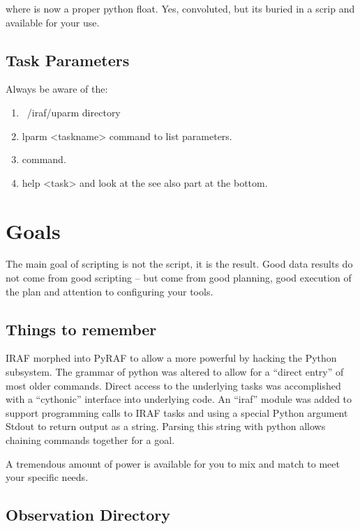 \documentclass[letter,11pt,oneside]{article}
\newcommand{\dhl}[1]{{\color{verbcolor}{\texttt#1}}}
\begin{document}
where \dhl{mymean} is now a proper python float. Yes, convoluted, but
its buried in a scrip and available for your use. 

\subsection{Task Parameters}

Always be aware of the:
\vspace{-.15cm}
\begin{enumerate}\addtolength{\itemsep}{-0.5\baselineskip}
   \item    ~/iraf/uparm directory
   \item    lparm <taskname> command to list parameters.
   \item    \dhl{unlearn <task>} command.
   \item   help <task> and look at the see also part at the bottom.
\end{enumerate}

\section{Goals}

The main goal of scripting is not the script, it is the result. Good
data results do not come from good scripting -- but come from good
planning, good execution of the plan and attention to configuring
your tools.


\subsection{Things to remember}

IRAF \dhl{cl} morphed into PyRAF \cite{2006hstc.conf..437G} to allow a more
powerful \dhl{cl} by hacking the Python \dhl{readline} subsystem. The
grammar of python was altered to allow for a ``direct entry'' of most older
\dhl{cl} commands. Direct access to the underlying tasks was
accomplished with a ``cythonic'' interface into underlying code. An ``iraf''
module was added to support programming calls to IRAF tasks and using 
a special Python \dhl{keyword} argument Stdout to return output as a string.
Parsing this string with python allows chaining \dhl{cl} commands together
for a goal.

A tremendous amount of power is available for you to mix and match to meet
your specific needs. 

\subsection{Observation Directory}
\end{document}

